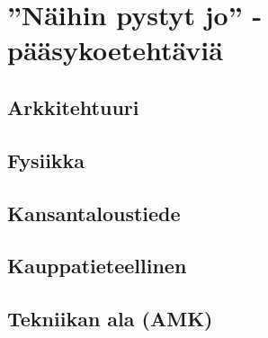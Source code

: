 \chapter{''Näihin pystyt jo'' -pääsykoetehtäviä}

\section{Arkkitehtuuri}

\section{Fysiikka}

\section{Kansantaloustiede}

\section{Kauppatieteellinen}

\section{Tekniikan ala (AMK)}

